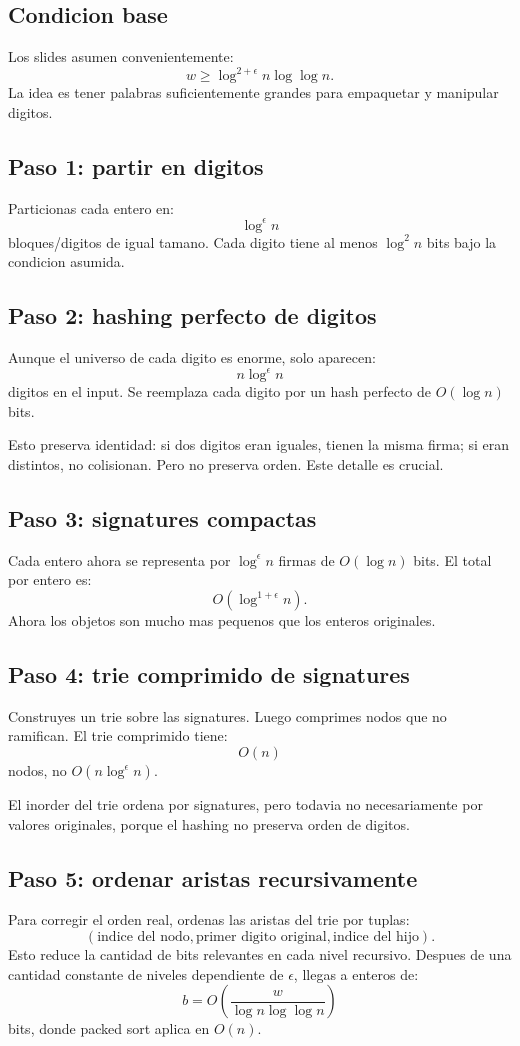 \documentclass[10pt]{article}
\newcommand{\bigO}{O}
\begin{document}
\subsection{Condicion base}
Los slides asumen convenientemente:
\[
w\ge \log^{2+\epsilon}n\log\log n.
\]
La idea es tener palabras suficientemente grandes para empaquetar y manipular
digitos.

\subsection{Paso 1: partir en digitos}
Particionas cada entero en:
\[
\log^\epsilon n
\]
bloques/digitos de igual tamano. Cada digito tiene al menos $\log^2 n$ bits
bajo la condicion asumida.

\subsection{Paso 2: hashing perfecto de digitos}
Aunque el universo de cada digito es enorme, solo aparecen:
\[
n\log^\epsilon n
\]
digitos en el input. Se reemplaza cada digito por un hash perfecto de
$\bigO(\log n)$ bits.

Esto preserva identidad: si dos digitos eran iguales, tienen la misma firma; si
eran distintos, no colisionan. Pero no preserva orden. Este detalle es crucial.

\subsection{Paso 3: signatures compactas}
Cada entero ahora se representa por $\log^\epsilon n$ firmas de $\bigO(\log n)$
bits. El total por entero es:
\[
\bigO(\log^{1+\epsilon}n).
\]
Ahora los objetos son mucho mas pequenos que los enteros originales.

\subsection{Paso 4: trie comprimido de signatures}
Construyes un trie sobre las signatures. Luego comprimes nodos que no ramifican.
El trie comprimido tiene:
\[
\bigO(n)
\]
nodos, no $\bigO(n\log^\epsilon n)$.

El inorder del trie ordena por signatures, pero todavia no necesariamente por
valores originales, porque el hashing no preserva orden de digitos.

\subsection{Paso 5: ordenar aristas recursivamente}
Para corregir el orden real, ordenas las aristas del trie por tuplas:
\[
(\text{indice del nodo},\text{primer digito original},\text{indice del hijo}).
\]
Esto reduce la cantidad de bits relevantes en cada nivel recursivo. Despues de
una cantidad constante de niveles dependiente de $\epsilon$, llegas a enteros de:
\[
b=\bigO\left(\frac{w}{\log n\log\log n}\right)
\]
bits, donde packed sort aplica en $\bigO(n)$.
\end{document}
